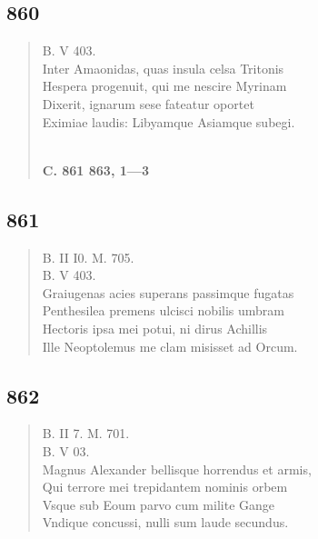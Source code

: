 \documentclass[11pt, a4paper]{report}
\begin{document}
            \subsection*{860}
      \begin{verse}
      B. V 403. \\ Inter Amaonidas, quas insula celsa Tritonis \\ Hespera progenuit, qui me nescire Myrinam \\ Dixerit, ignarum sese fateatur oportet \\ Eximiae laudis: Libyamque Asiamque subegi. \\ 
        ﻿\pagebreak 
    \begin{center} \textbf{C. 861 863, 1—3} \end{center} \marginpar{[313]} 
      \end{verse}
  
            \subsection*{861}
      \begin{verse}
      B. II I0. M. 705. \\ B. V 403. \\ Graiugenas acies superans passimque fugatas \\ Penthesilea premens ulcisci nobilis umbram \\ Hectoris ipsa mei potui, ni dirus Achillis \\ Ille Neoptolemus me clam misisset ad Orcum. \\ 
      \end{verse}
  
            \subsection*{862}
      \begin{verse}
      B. II 7. M. 701. \\ B. V 03. \\ Magnus Alexander bellisque horrendus et armis, \\ Qui terrore mei trepidantem nominis orbem \\ Vsque sub Eoum parvo cum milite Gange \\ Vndique concussi, nulli sum laude secundus. \\ 
      \end{verse}
  
\end{document}
